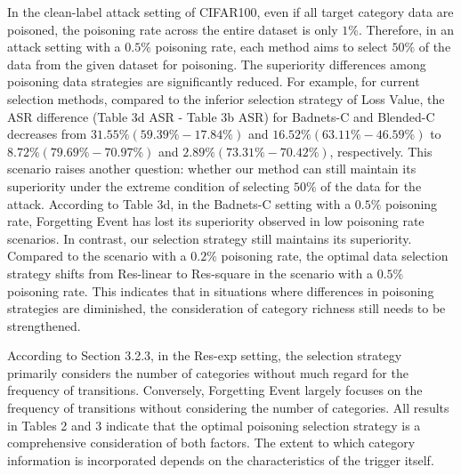 \documentclass{article}
\begin{document}
In the clean-label attack setting of CIFAR100, even if all target category data are poisoned, the poisoning rate across the entire dataset is only \(1\%\). Therefore, in an attack setting with a \(0.5\%\) poisoning rate, each method aims to select \(50\%\) of the data from the given dataset for poisoning. The superiority differences among poisoning data strategies are significantly reduced. For example, for current selection methods, compared to the inferior selection strategy of Loss Value, the ASR difference (Table 3d ASR - Table 3b ASR) for Badnets-C and Blended-C decreases from \(31.55\% (59.39\% - 17.84\%)\) and \(16.52\% (63.11\% - 46.59\%)\) to \(8.72\% (79.69\% - 70.97\%)\) and \(2.89\% (73.31\% - 70.42\%)\), respectively. This scenario raises another question: whether our method can still maintain its superiority under the extreme condition of selecting \(50\%\) of the data for the attack. According to Table 3d, in the Badnets-C setting with a \(0.5\%\) poisoning rate, Forgetting Event has lost its superiority observed in low poisoning rate scenarios. In contrast, our selection strategy still maintains its superiority. Compared to the scenario with a \(0.2\%\) poisoning rate, the optimal data selection strategy shifts from Res-linear to Res-square in the scenario with a \(0.5\%\) poisoning rate. This indicates that in situations where differences in poisoning strategies are diminished, the consideration of category richness still needs to be strengthened. 

According to Section 3.2.3, in the Res-exp setting, the selection strategy primarily considers the number of categories without much regard for the frequency of transitions. Conversely, Forgetting Event largely focuses on the frequency of transitions without considering the number of categories. All results in Tables 2 and 3 indicate that the optimal poisoning selection strategy is a comprehensive consideration of both factors. The extent to which category information is incorporated depends on the characteristics of the trigger itself.
\end{document}
